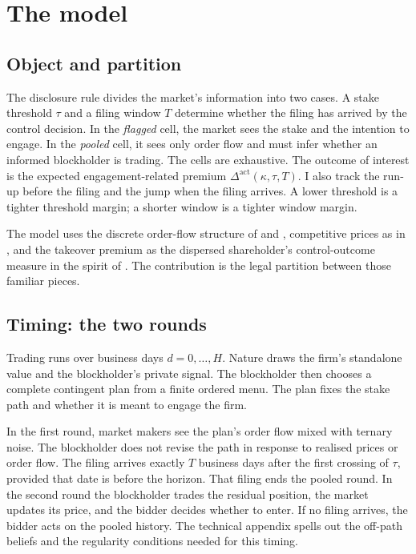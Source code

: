 \documentclass[11pt]{article}
\makeatletter
\newcommand{\compatlabel}[2]{\begingroup\phantomsection\def\@currentlabel{#1}\label{#2}\endgroup}
\newcommand{\Dact}{\Delta^{\mathrm{act}}}
\makeatother
\begin{document}
\section{The model}
\label{sec:model}
\label{sec:hypotheses}

\subsection{Object and partition}
\label{sec:object}

The disclosure rule divides the market's information into two cases. A stake threshold $\tau$ and a
filing window $T$ determine whether the filing has arrived by the control decision. In the \emph{flagged}
cell, the market sees the stake and the intention to engage. In the \emph{pooled} cell, it sees only
order flow and must infer whether an informed blockholder is trading. The cells are exhaustive. The
outcome of interest is the expected engagement-related premium $\Dact(\kappa,\tau,T)$. I also track
the run-up before the filing and the jump when the filing arrives. A lower threshold is a tighter
threshold margin; a shorter window is a tighter window margin.

The model uses the discrete order-flow structure of \citet{Kyle1985} and
\citet{EdmansGoldsteinJiang2015}, competitive prices as in \citet{GlostenMilgrom1985}, and the
takeover premium as the dispersed shareholder's control-outcome measure in the spirit of
\citet{GrossmanHart1980}. The contribution is the legal partition between those familiar pieces.
\subsection{Timing: the two rounds}
\label{sec:timing}

Trading runs over business days $d=0,\ldots,H$. Nature draws the firm's standalone value and the
blockholder's private signal. The blockholder then chooses a complete contingent plan from a finite
ordered menu. The plan fixes the stake path and whether it is meant to engage the firm.

In the first round, market makers see the plan's order flow mixed with ternary noise. The blockholder
does not revise the path in response to realised prices or order flow. The filing arrives exactly $T$
business days after the first crossing of $\tau$, provided that date is before the horizon. That filing
ends the pooled round. In the second round the blockholder trades the residual position, the market
updates its price, and the bidder decides whether to enter. If no filing arrives, the bidder acts on the
pooled history. The technical appendix spells out the off-path beliefs and the regularity conditions
needed for this timing.
\compatlabel{1}{asm:timing}
\compatlabel{1(a)}{asm:nofeedback}
\compatlabel{1(b)}{asm:flagterm}
\compatlabel{1(c)}{asm:A4}
\compatlabel{1(d)}{asm:A8}
\end{document}
